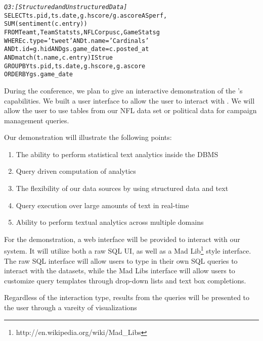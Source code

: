 
\begin{small}
\begin{alltt}
\textit{Q3: [Structured and Unstructured Data]}
SELECT ts.pid, ts.date, g.hscore / g.ascore AS perf,
  SUM(sentiment(c.entry))
FROM Team t, TeamStats ts, NFLCorpus c, GameStats g
WHERE c.type = 'tweet' AND t.name = 'Cardinals' 
  AND t.id = g.hid AND gs.game_date = c.posted_at 
  AND match(t.name,c.entry) IS true
GROUP BY ts.pid, ts.date, g.hscore, g.ascore
ORDER BY gs.game_date
\end{alltt}
\end{small}


During the conference, we plan to give an interactive demonstration of the 
{\system}'s capabilities.
We built a user interface to allow the user to interact with \system. 
We will allow the user to use tables from our NFL data set or political data
for campaign management queries.

Our demonstration will illustrate the following points: 
\begin{enumerate}
  \item The ability to perform statistical text analytics inside the DBMS
  \item Query driven computation of analytics
  \item The flexibility of our data sources by using structured data and text
  \item Query execution over large amounts of text in real-time
  \item Ability to perform textual analytics across multiple domains
\end{enumerate} 

For the demonstration, a web interface will be provided to interact with our
system. It will utilize both a raw SQL UI, as well as a Mad
Lib\footnote{http://en.wikipedia.org/wiki/Mad\_Libs} style interface. The raw
SQL interface will allow users to type in their own SQL queries to interact with
the datasets, while the Mad Libs interface will allow users to customize query
templates through drop-down lists and text box completions.

Regardless of the interaction type, results from the queries will be presented 
to the user through a vareity of visualizations

